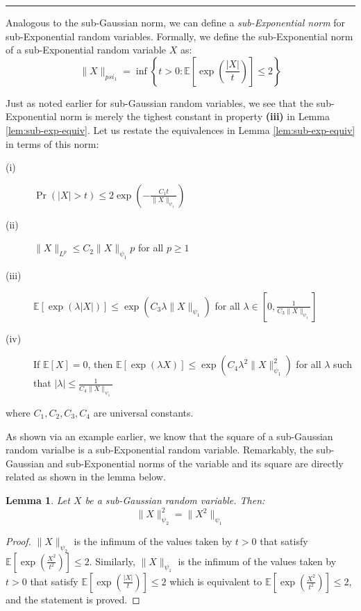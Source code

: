 \documentclass{article}
\newtheorem{lemma}{Lemma}[subsection]
\theoremstyle{remark}
\newcommand{\comprule}{\textcolor[RGB]{220,220,220}{\rule{\linewidth}{0.2pt}}}
\newcommand{\Exp}{\mathbb{E}}
\begin{document}
\comprule

Analogous to the sub-Gaussian norm, we can define a \emph{sub-Exponential norm} for sub-Exponential random variables. Formally, we define the sub-Exponential norm of a sub-Exponential random variable \(X\) as:
\begin{equation*}
\|X\|_{psi_{1}} = \inf\left\{t > 0 : \Exp\left[\exp\left(\frac{|X|}{t}\right)\right] \leq 2 \right\}
\end{equation*}

Just as noted earlier for sub-Gaussian random variables, we see that the sub-Exponential norm is merely the tighest constant in property \textbf{(iii)} in Lemma \ref{lem:sub-exp-equiv}. Let us restate the equivalences in Lemma \ref{lem:sub-exp-equiv} in terms of this norm:

\begin{description}
\item [(i)] \(\Pr\left(|X| > t\right) \leq 2\exp\left(-\frac{C_{1}t}{\|X\|_{\psi_{1}}}\right)\)
\item [(ii)] \(\|X\|_{L^{p}} \leq C_{2}\|X\|_{\psi_{1}}p\) for all \(p \geq 1\)
\item [(iii)] \(\Exp\left[\exp(\lambda|X|)\right] \leq \exp(C_{3}\lambda\|X\|_{\psi_{1}})\) for all \(\lambda \in \left[0, \frac{1}{C_{3}\|X\|_{\psi_{1}}}\right]\)
\item [(iv)] If \(\Exp[X] = 0\), then \(\Exp[\exp(\lambda X)] \leq \exp(C_{4}\lambda^{2}\|X\|_{\psi_{1}}^{2})\) for all \(\lambda\) such that \(|\lambda| \leq \frac{1}{C_{4} \|X\|_{\psi_{1}}}\)
\end{description}
where \(C_{1}, C_{2}, C_{3}, C_{4}\) are universal constants.

As shown via an example earlier, we know that the square of a sub-Gaussian random varialbe is a sub-Exponential random variable. Remarkably, the sub-Gaussian and sub-Exponential norms of the variable and its square are directly related as shown in the lemma below.

\begin{lemma}
\label{lem:psi-1-psi-2-norm}
Let \(X\) be a sub-Gaussian random variable. Then:
\begin{equation*}
\|X\|^{2}_{\psi_{2}} = \|X^{2}\|_{\psi_{1}}
\end{equation*}
\end{lemma}

\begin{proof}
\(\|X\|_{\psi_{2}}\) is the infimum of the values taken by \(t > 0\) that satisfy \(\Exp\left[\exp\left(\frac{X^{2}}{t^{2}}\right)\right] \leq 2\). Similarly, \(\|X\|_{\psi_{1}}\) is the infimum of the values taken by \(t > 0\) that satisfy \(\Exp\left[\exp\left(\frac{|X|}{t}\right)\right] \leq 2\) which is equivalent to \(\Exp\left[\exp\left(\frac{X^{2}}{t^{2}}\right)\right] \leq 2\), and the statement is proved.
\end{proof}
\end{document}
